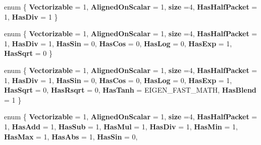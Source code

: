 \begin{DoxyCompactItemize}
enum \{ \newline
{\bfseries Vectorizable} = 1, 
{\bfseries Aligned\+On\+Scalar} = 1, 
{\bfseries size} =4, 
{\bfseries Has\+Half\+Packet} = 1, 
\newline
{\bfseries Has\+Div} = 1
 \}
\item 
\mbox{\label{struct_eigen_1_1internal_1_1packet__traits_3_01float_01_4_aa01f175ab71e89f7594101421ed04a0e}} 
enum \{ \newline
{\bfseries Vectorizable} = 1, 
{\bfseries Aligned\+On\+Scalar} = 1, 
{\bfseries size} =4, 
{\bfseries Has\+Half\+Packet} = 1, 
\newline
{\bfseries Has\+Div} = 1, 
{\bfseries Has\+Sin} = 0, 
{\bfseries Has\+Cos} = 0, 
{\bfseries Has\+Log} = 0, 
\newline
{\bfseries Has\+Exp} = 1, 
{\bfseries Has\+Sqrt} = 0
 \}
\item 
\mbox{\label{struct_eigen_1_1internal_1_1packet__traits_3_01float_01_4_afe53c01feb21f7d2fcfaea52912900b8}} 
enum \{ \newline
{\bfseries Vectorizable} = 1, 
{\bfseries Aligned\+On\+Scalar} = 1, 
{\bfseries size} =4, 
{\bfseries Has\+Half\+Packet} = 1, 
\newline
{\bfseries Has\+Div} = 1, 
{\bfseries Has\+Sin} = 0, 
{\bfseries Has\+Cos} = 0, 
{\bfseries Has\+Log} = 0, 
\newline
{\bfseries Has\+Exp} = 1, 
{\bfseries Has\+Sqrt} = 0, 
{\bfseries Has\+Rsqrt} = 0, 
{\bfseries Has\+Tanh} = E\+I\+G\+E\+N\+\_\+\+F\+A\+S\+T\+\_\+\+M\+A\+TH, 
\newline
{\bfseries Has\+Blend} = 1
 \}
\item 
\mbox{\label{struct_eigen_1_1internal_1_1packet__traits_3_01float_01_4_a41666e621507738f4550eb8c668e7b1a}} 
enum \{ \newline
{\bfseries Vectorizable} = 1, 
{\bfseries Aligned\+On\+Scalar} = 1, 
{\bfseries size} =4, 
{\bfseries Has\+Half\+Packet} = 1, 
\newline
{\bfseries Has\+Add} = 1, 
{\bfseries Has\+Sub} = 1, 
{\bfseries Has\+Mul} = 1, 
{\bfseries Has\+Div} = 1, 
\newline
{\bfseries Has\+Min} = 1, 
{\bfseries Has\+Max} = 1, 
{\bfseries Has\+Abs} = 1, 
{\bfseries Has\+Sin} = 0, 

\end{DoxyCompactItemize}
